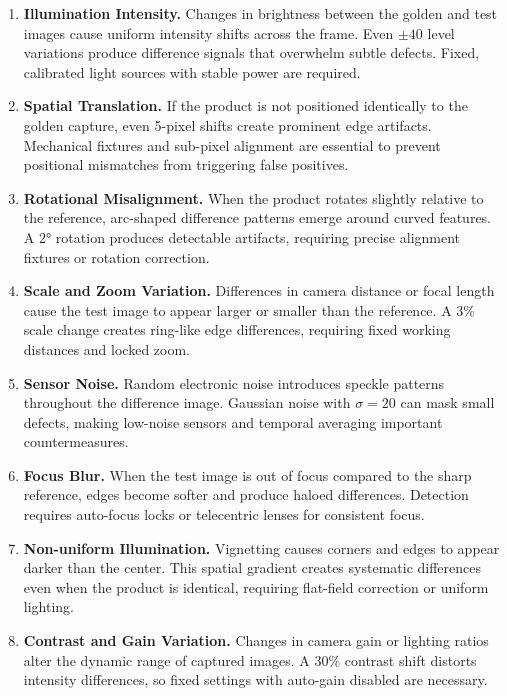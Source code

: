 \documentclass[12pt]{article}
\begin{document}
\begin{stepbox}
\small
\begin{enumerate}[leftmargin=*, itemsep=0.4em]
\item \textbf{Illumination Intensity.} Changes in brightness between the golden and test images cause uniform intensity shifts across the frame. Even $\pm 40$ level variations produce difference signals that overwhelm subtle defects. Fixed, calibrated light sources with stable power are required.

\item \textbf{Spatial Translation.} If the product is not positioned identically to the golden capture, even 5-pixel shifts create prominent edge artifacts. Mechanical fixtures and sub-pixel alignment are essential to prevent positional mismatches from triggering false positives.

\item \textbf{Rotational Misalignment.} When the product rotates slightly relative to the reference, arc-shaped difference patterns emerge around curved features. A 2° rotation produces detectable artifacts, requiring precise alignment fixtures or rotation correction.

\item \textbf{Scale and Zoom Variation.} Differences in camera distance or focal length cause the test image to appear larger or smaller than the reference. A 3\% scale change creates ring-like edge differences, requiring fixed working distances and locked zoom.

\item \textbf{Sensor Noise.} Random electronic noise introduces speckle patterns throughout the difference image. Gaussian noise with $\sigma = 20$ can mask small defects, making low-noise sensors and temporal averaging important countermeasures.

\item \textbf{Focus Blur.} When the test image is out of focus compared to the sharp reference, edges become softer and produce haloed differences. Detection requires auto-focus locks or telecentric lenses for consistent focus.

\item \textbf{Non-uniform Illumination.} Vignetting causes corners and edges to appear darker than the center. This spatial gradient creates systematic differences even when the product is identical, requiring flat-field correction or uniform lighting.

\item \textbf{Contrast and Gain Variation.} Changes in camera gain or lighting ratios alter the dynamic range of captured images. A 30\% contrast shift distorts intensity differences, so fixed settings with auto-gain disabled are necessary.


\end{enumerate}
\end{stepbox}
\end{document}
